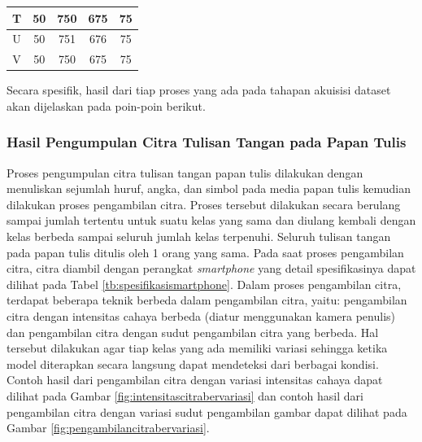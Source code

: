 \begin{center}
\begin{longtable}[c]{|c|c|c|c|c|}
  T              & 50                    & 750                     & 675                                                                       & 75                                                                             \\ \hline
  U              & 50                    & 751                     & 676                                                                       & 75                                                                             \\ \hline
  V              & 50                    & 750                     & 675                                                                       & 75                                                                             \\ \hline
  \end{longtable}
\end{center}

Secara spesifik, hasil dari tiap proses yang ada pada tahapan akuisisi dataset akan dijelaskan pada poin-poin berikut. \par

\subsubsection{Hasil Pengumpulan Citra Tulisan Tangan pada Papan Tulis}
\label{subsubsec:hasilpengumpulancitra}

Proses pengumpulan citra tulisan tangan papan tulis dilakukan dengan menuliskan sejumlah huruf, angka, dan simbol pada media papan tulis kemudian dilakukan proses pengambilan citra. Proses tersebut dilakukan secara berulang sampai jumlah tertentu untuk suatu kelas yang sama dan diulang kembali dengan kelas berbeda sampai seluruh jumlah kelas terpenuhi. Seluruh tulisan tangan pada papan tulis ditulis oleh 1 orang yang sama. Pada saat proses pengambilan citra, citra diambil dengan perangkat \textit{smartphone} yang detail spesifikasinya dapat dilihat pada Tabel \ref*{tb:spesifikasismartphone}. Dalam proses pengambilan citra, terdapat beberapa teknik berbeda dalam pengambilan citra, yaitu: pengambilan citra dengan intensitas cahaya berbeda (diatur menggunakan kamera penulis) dan pengambilan citra dengan sudut pengambilan citra yang berbeda. Hal tersebut dilakukan agar tiap kelas yang ada memiliki variasi sehingga ketika model diterapkan secara langsung dapat mendeteksi dari berbagai kondisi. Contoh hasil dari pengambilan citra dengan variasi intensitas cahaya dapat dilihat pada Gambar \ref{fig:intensitascitrabervariasi} dan contoh hasil dari pengambilan citra dengan variasi sudut pengambilan gambar dapat dilihat pada Gambar \ref*{fig:pengambilancitrabervariasi}.  \par

